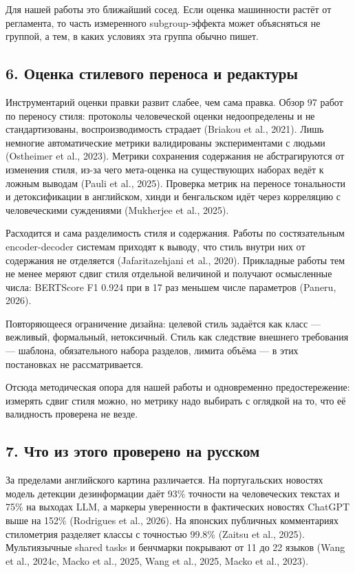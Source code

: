 \documentclass[11pt,a4paper]{article}
\renewcommand{\_}{\textunderscore\allowbreak}
\begin{document}
Для нашей работы это ближайший сосед. Если оценка машинности растёт от
регламента, то часть измеренного subgroup-эффекта может объясняться не группой, а
тем, в каких условиях эта группа обычно пишет.

\subsection{6. Оценка стилевого переноса и редактуры}

Инструментарий оценки правки развит слабее, чем сама правка. Обзор 97 работ по
переносу стиля: протоколы человеческой оценки недоопределены и не
стандартизованы, воспроизводимость страдает (Briakou et al., 2021). Лишь немногие автоматические
метрики валидированы экспериментами с людьми (Ostheimer et al., 2023). Метрики сохранения
содержания не абстрагируются от изменения стиля, из-за чего мета-оценка на
существующих наборах ведёт к ложным выводам (Pauli et al., 2025). Проверка метрик на переносе
тональности и детоксификации в английском, хинди и бенгальском идёт через
корреляцию с человеческими суждениями (Mukherjee et al., 2025).

Расходится и сама разделимость стиля и содержания. Работы по состязательным
encoder-decoder системам приходят к выводу, что стиль внутри них от содержания не
отделяется (Jafaritazehjani et al., 2020). Прикладные работы тем не менее меряют сдвиг стиля отдельной
величиной и получают осмысленные числа: BERTScore F1 0.924 при в 17 раз меньшем
числе параметров (Paneru, 2026).

Повторяющееся ограничение дизайна: целевой стиль задаётся как класс — вежливый,
формальный, нетоксичный. Стиль как следствие внешнего требования — шаблона,
обязательного набора разделов, лимита объёма — в этих постановках не
рассматривается.

Отсюда методическая опора для нашей работы и одновременно предостережение:
измерять сдвиг стиля можно, но метрику надо выбирать с оглядкой на то, что её
валидность проверена не везде.

\subsection{7. Что из этого проверено на русском}

За пределами английского картина различается. На португальских новостях модель
детекции дезинформации даёт 93\% точности на человеческих текстах и 75\% на выходах
LLM, а маркеры уверенности в фактических новостях ChatGPT выше на 152\% (Rodrigues et al., 2026). На
японских публичных комментариях стилометрия разделяет классы с точностью 99.8\%
(Zaitsu et al., 2025). Мультиязычные shared tasks и бенчмарки покрывают от 11 до 22 языков
(Wang et al., 2024c, Macko et al., 2025, Wang et al., 2025, Macko et al., 2023).
\end{document}
